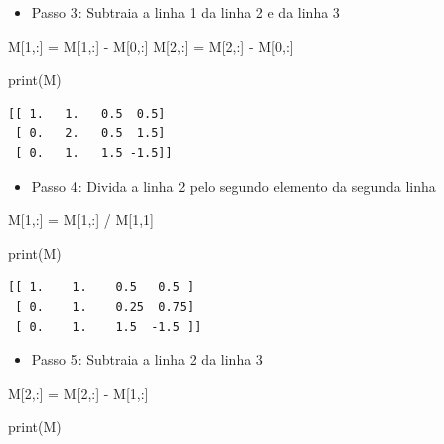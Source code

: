 \documentclass[
  brazilian,
  letterpaper,
  DIV=11,
  numbers=noendperiod]{scrreprt}
\newenvironment{Shaded}{\begin{snugshade}}{\end{snugshade}}
\newcommand{\BuiltInTok}[1]{\textcolor[rgb]{0.00,0.23,0.31}{#1}}
\newcommand{\DecValTok}[1]{\textcolor[rgb]{0.68,0.00,0.00}{#1}}
\newcommand{\NormalTok}[1]{\textcolor[rgb]{0.00,0.23,0.31}{#1}}
\newcommand{\OperatorTok}[1]{\textcolor[rgb]{0.37,0.37,0.37}{#1}}
\providecommand{\tightlist}{%
  \setlength{\itemsep}{0pt}\setlength{\parskip}{0pt}}
\begin{document}
\begin{itemize}
\tightlist
\item
  Passo 3: Subtraia a linha 1 da linha 2 e da linha 3
\end{itemize}

\begin{Shaded}
\begin{Highlighting}[]
\NormalTok{M[}\DecValTok{1}\NormalTok{,:] }\OperatorTok{=}\NormalTok{ M[}\DecValTok{1}\NormalTok{,:] }\OperatorTok{{-}}\NormalTok{ M[}\DecValTok{0}\NormalTok{,:]}
\NormalTok{M[}\DecValTok{2}\NormalTok{,:] }\OperatorTok{=}\NormalTok{ M[}\DecValTok{2}\NormalTok{,:] }\OperatorTok{{-}}\NormalTok{ M[}\DecValTok{0}\NormalTok{,:]}

\BuiltInTok{print}\NormalTok{(M)}
\end{Highlighting}
\end{Shaded}

\begin{verbatim}
[[ 1.   1.   0.5  0.5]
 [ 0.   2.   0.5  1.5]
 [ 0.   1.   1.5 -1.5]]
\end{verbatim}

\begin{itemize}
\tightlist
\item
  Passo 4: Divida a linha 2 pelo segundo elemento da segunda linha
\end{itemize}

\begin{Shaded}
\begin{Highlighting}[]
\NormalTok{M[}\DecValTok{1}\NormalTok{,:] }\OperatorTok{=}\NormalTok{ M[}\DecValTok{1}\NormalTok{,:] }\OperatorTok{/}\NormalTok{ M[}\DecValTok{1}\NormalTok{,}\DecValTok{1}\NormalTok{]}

\BuiltInTok{print}\NormalTok{(M)}
\end{Highlighting}
\end{Shaded}

\begin{verbatim}
[[ 1.    1.    0.5   0.5 ]
 [ 0.    1.    0.25  0.75]
 [ 0.    1.    1.5  -1.5 ]]
\end{verbatim}

\begin{itemize}
\tightlist
\item
  Passo 5: Subtraia a linha 2 da linha 3
\end{itemize}

\begin{Shaded}
\begin{Highlighting}[]
\NormalTok{M[}\DecValTok{2}\NormalTok{,:] }\OperatorTok{=}\NormalTok{ M[}\DecValTok{2}\NormalTok{,:] }\OperatorTok{{-}}\NormalTok{ M[}\DecValTok{1}\NormalTok{,:]}

\BuiltInTok{print}\NormalTok{(M)}
\end{Highlighting}
\end{Shaded}
\end{document}
